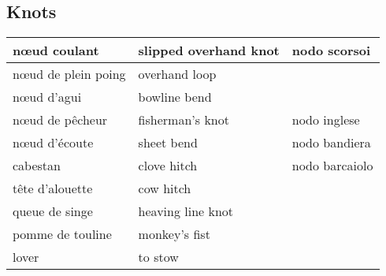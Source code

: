 \documentclass[a4paper, 12pt, twoside]{article}
\begin{document}
\begin{indt}{\section{Knots}}
\begin{tabular}{|l|l|l|}
            \hline %
            n\oe ud coulant %
            & slipped overhand knot
            & nodo scorsoi
            \\
            \hline %
            n\oe ud de plein poing %
            & overhand loop
            &
            \\
            \hline %
            n\oe ud d'agui %
            & bowline bend
            &
            \\
            \hline %
            n\oe ud de pêcheur %
            & fisherman's knot
            & nodo inglese
            \\
            \hline %
            n\oe ud d'écoute %
            & sheet bend
            & nodo bandiera
            \\
            \hline %
            cabestan %
            & clove hitch
            & nodo barcaiolo
            \\
            \hline %
            tête d'alouette %
            & cow hitch
            &
            \\
            \hline %
            queue de singe %
            & heaving line knot
            &
            \\
            \hline %
            pomme de touline %
            & monkey's fist
            &
            \\
            \hline %
            lover %
            & to stow
            &
            \\
            \hline %
        \end{tabular}
    \end{indt} %
\end{document}
